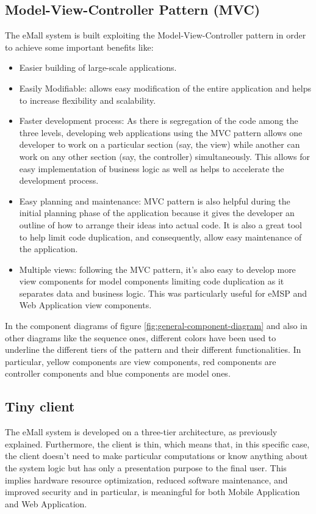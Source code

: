 \documentclass[a4paper]{report}
\begin{document}
\subsection{Model-View-Controller Pattern (MVC)}
The eMall system is built exploiting the Model-View-Controller pattern in order to achieve some important benefits like:
\begin{itemize}
    \item Easier building of large-scale applications.
    \item Easily Modifiable: allows easy modification of the entire application and helps to increase flexibility and scalability.
    \item Faster development process: As there is segregation of the code among the three levels, developing web applications using the MVC pattern allows one developer to work on a particular section (say, the view) while another can work on any other section (say, the controller) simultaneously. This allows for easy implementation of business logic as well as helps to accelerate the development process.
    \item Easy planning and maintenance: MVC pattern is also helpful during the initial planning phase of the application because it gives the developer an outline of how to arrange their ideas into actual code. It is also a great tool to help limit code duplication, and consequently, allow easy maintenance of the application.
    \item Multiple views: following the MVC pattern, it's also easy to develop more view components for model components limiting code duplication as it separates data and business logic. This was particularly useful for eMSP and Web Application view components.
\end{itemize}
In the component diagrams of figure \ref{fig:general-component-diagram} and also in other diagrams like the sequence ones, different colors have been used to underline the different tiers of the pattern and their different functionalities. In particular, yellow components are view components, red components are controller components and blue components are model ones.

\subsection{Tiny client}
The eMall system is developed on a three-tier architecture, as previously explained. Furthermore, the client is thin, which means that, in this specific case, the client doesn't need to make particular computations or know anything about the system logic but has only a presentation purpose to the final user. This implies hardware resource optimization, reduced software maintenance, and improved security and in particular, is meaningful for both Mobile Application and Web Application.
\end{document}
